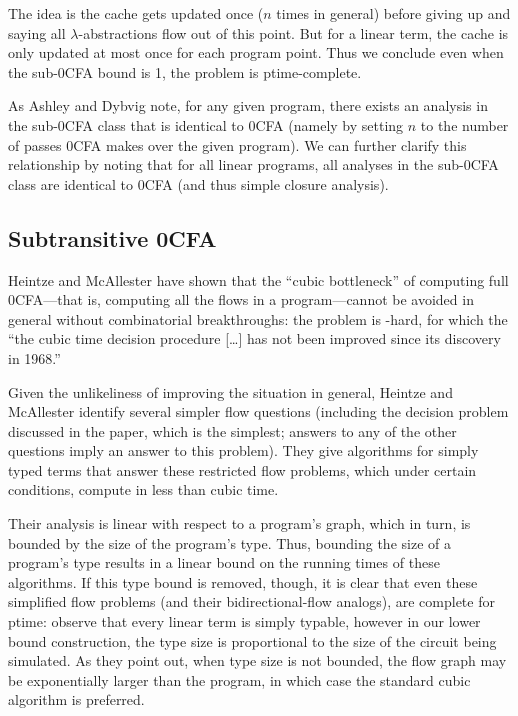 \documentclass{llncs}
\newcommand\ptime{{\sc ptime}}
\begin{document}
The idea is the cache gets updated once ($n$ times in general) before
giving up and saying all $\lambda$-abstractions flow out of this
point.  But for a linear term, the cache is only updated at most once
for each program point.  Thus we conclude even when the sub-0CFA bound
is 1, the problem is \ptime-complete.

As Ashley and Dybvig note, for any given program, there exists an
analysis in the sub-0CFA class that is identical to 0CFA (namely by
setting $n$ to the number of passes 0CFA makes over the given
program).  We can further clarify this relationship by noting that for
all linear programs, all analyses in the sub-0CFA class are identical
to 0CFA (and thus simple closure analysis).

\subsection{Subtransitive 0CFA}

Heintze and McAllester \cite{heintze-mcallester-97b} have shown that
the ``cubic bottleneck'' of computing full 0CFA---that is, computing
all the flows in a program---cannot be avoided in general without
combinatorial breakthroughs: the problem is {}-hard, for
which the ``the cubic time decision procedure [\dots] has not been
improved since its discovery in 1968.''

Given the unlikeliness of improving the situation in general, Heintze
and McAllester \cite{heintze-mcallester-97a} identify several simpler
flow questions (including the decision problem discussed in the paper,
which is the simplest; answers to any of the other questions imply an
answer to this problem).  They give algorithms for simply typed terms
that answer these restricted flow problems, which under certain
conditions, compute in less than cubic time.

Their analysis is linear with respect to a program's graph, which in
turn, is bounded by the size of the program's type.  Thus, bounding
the size of a program's type results in a linear bound on the running
times of these algorithms.  If this type bound is removed, though, it
is clear that even these simplified flow problems (and their
bidirectional-flow analogs), are complete for \ptime: observe that
every linear term is simply typable, however in our lower bound
construction, the type size is proportional to the size of the circuit
being simulated.  As they point out, when type size is not bounded,
the flow graph may be exponentially larger than the program, in which
case the standard cubic algorithm is preferred.
\end{document}
